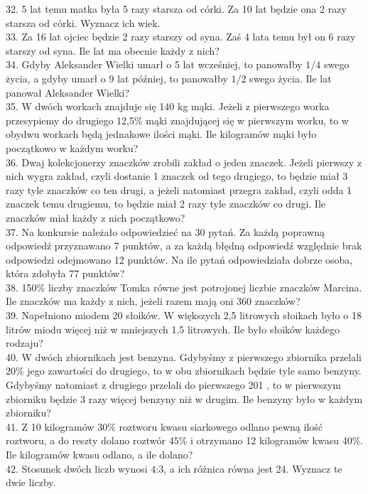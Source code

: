 \documentclass[10pt]{article}
\begin{document}
32. 5 lat temu matka była 5 razy starsza od córki. Za 10 lat będzie ona 2 razy starsza od córki. Wyznacz ich wiek.\\
33. Za 16 lat ojciec będzie 2 razy starszy od syna. Zaś 4 lata temu był on 6 razy starszy od syna. Ile lat ma obecnie każdy z nich?\\
34. Gdyby Aleksander Wielki umarł o 5 lat wcześniej, to panowałby \(1 / 4\) swego życia, a gdyby umarł o 9 lat później, to panowałby \(1 / 2\) swego życia. Ile lat panował Aleksander Wielki?\\
35. W dwóch workach znajduje się 140 kg mąki. Jeżeli z pierwszego worka przesypiemy do drugiego 12,5\% mąki znajdującej się w pierwszym worku, to w obydwu workach będą jednakowe ilości mąki. Ile kilogramów mąki było początkowo w każdym worku?\\
36. Dwaj kolekcjonerzy znaczków zrobili zakład o jeden znaczek. Jeżeli pierwszy z nich wygra zakład, czyli dostanie 1 znaczek od tego drugiego, to będzie miał 3 razy tyle znaczków co ten drugi, a jeżeli natomiast przegra zakład, czyli odda 1 znaczek temu drugiemu, to będzie miał 2 razy tyle znaczków co drugi. Ile znaczków miał każdy z nich początkowo?\\
37. Na konkursie należało odpowiedzieć na 30 pytań. Za każdą poprawną odpowiedź przyznawano 7 punktów, a za każdą błędną odpowiedź względnie brak odpowiedzi odejmowano 12 punktów. Na ile pytań odpowiedziała dobrze osoba, która zdobyła 77 punktów?\\
38. 150\% liczby znaczków Tomka równe jest potrojonej liczbie znaczków Marcina. Ile znaczków ma każdy z nich, jeżeli razem mają oni 360 znaczków?\\
39. Napełniono miodem 20 słoików. W większych 2,5 litrowych słoikach było o 18 litrów miodu więcej niż w mniejszych 1,5 litrowych. Ile było słoików każdego rodzaju?\\
40. W dwóch zbiornikach jest benzyna. Gdybyśmy z pierwszego zbiornika przelali \(20 \%\) jego zawartości do drugiego, to w obu zbiornikach będzie tyle samo benzyny. Gdybyśmy natomiast z drugiego przelali do pierwszego 201 , to w pierwszym zbiorniku będzie 3 razy więcej benzyny niż w drugim. Ile benzyny było w każdym zbiorniku?\\
41. Z 10 kilogramów \(30 \%\) roztworu kwasu siarkowego odlano pewną ilość roztworu, a do reszty dolano roztwór \(45 \%\) i otrzymano 12 kilogramów kwasu 40\%. Ile kilogramów kwasu odlano, a ile dolano?\\
42. Stosunek dwóch liczb wynosi 4:3, a ich różnica równa jest 24. Wyznacz te dwie liczby.\\
\end{document}

